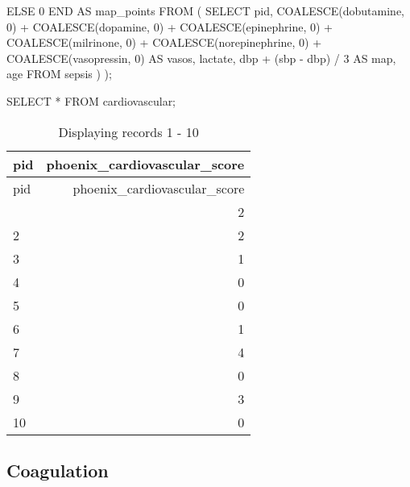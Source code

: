 \documentclass[
  letterpaper,
  DIV=11,
  numbers=noendperiod]{scrartcl}
\newenvironment{Shaded}{\begin{snugshade}}{\end{snugshade}}
\newcommand{\ControlFlowTok}[1]{\textcolor[rgb]{0.00,0.23,0.31}{#1}}
\newcommand{\DecValTok}[1]{\textcolor[rgb]{0.68,0.00,0.00}{#1}}
\newcommand{\FunctionTok}[1]{\textcolor[rgb]{0.28,0.35,0.67}{#1}}
\newcommand{\KeywordTok}[1]{\textcolor[rgb]{0.00,0.23,0.31}{#1}}
\newcommand{\NormalTok}[1]{\textcolor[rgb]{0.00,0.23,0.31}{#1}}
\newcommand{\OperatorTok}[1]{\textcolor[rgb]{0.37,0.37,0.37}{#1}}
\begin{document}
\begin{Shaded}
\begin{Highlighting}[]
         \ControlFlowTok{ELSE} \DecValTok{0} \ControlFlowTok{END} \KeywordTok{AS}\NormalTok{ map\_points}
  \KeywordTok{FROM}
\NormalTok{  (}
    \KeywordTok{SELECT}
\NormalTok{      pid,}
      \FunctionTok{COALESCE}\NormalTok{(dobutamine, }\DecValTok{0}\NormalTok{) }\OperatorTok{+}
        \FunctionTok{COALESCE}\NormalTok{(dopamine, }\DecValTok{0}\NormalTok{) }\OperatorTok{+}
        \FunctionTok{COALESCE}\NormalTok{(epinephrine, }\DecValTok{0}\NormalTok{) }\OperatorTok{+}
        \FunctionTok{COALESCE}\NormalTok{(milrinone, }\DecValTok{0}\NormalTok{) }\OperatorTok{+}
        \FunctionTok{COALESCE}\NormalTok{(norepinephrine, }\DecValTok{0}\NormalTok{) }\OperatorTok{+}
        \FunctionTok{COALESCE}\NormalTok{(vasopressin, }\DecValTok{0}\NormalTok{) }\KeywordTok{AS}\NormalTok{ vasos,}
\NormalTok{      lactate,}
\NormalTok{      dbp }\OperatorTok{+}\NormalTok{ (sbp }\OperatorTok{{-}}\NormalTok{ dbp) }\OperatorTok{/} \DecValTok{3} \KeywordTok{AS}\NormalTok{ map,}
\NormalTok{      age}
    \KeywordTok{FROM}\NormalTok{ sepsis}
\NormalTok{  )}
\NormalTok{);}
\end{Highlighting}
\end{Shaded}

\begin{Shaded}
\begin{Highlighting}[]
\KeywordTok{SELECT} \OperatorTok{*} \KeywordTok{FROM}\NormalTok{ cardiovascular;}
\end{Highlighting}
\end{Shaded}

\begin{longtable}[]{@{}lr@{}}
\caption{Displaying records 1 - 10}\tabularnewline
\toprule\noalign{}
pid & phoenix\_cardiovascular\_score \\
\midrule\noalign{}
\endfirsthead
\toprule\noalign{}
pid & phoenix\_cardiovascular\_score \\
\midrule\noalign{}
\endhead
\bottomrule\noalign{}
\endlastfoot
1 & 2 \\
2 & 2 \\
3 & 1 \\
4 & 0 \\
5 & 0 \\
6 & 1 \\
7 & 4 \\
8 & 0 \\
9 & 3 \\
10 & 0 \\
\end{longtable}

\subsection{Coagulation}\label{coagulation}
\end{document}
